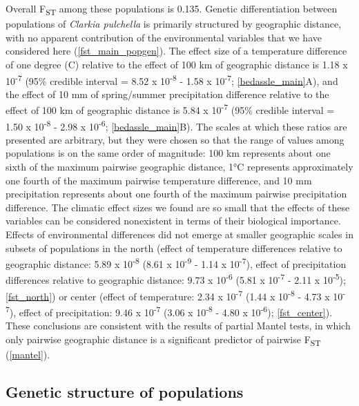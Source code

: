 \documentclass{article}
\begin{document}
Overall F\textsubscript{ST} among these populations is 0.135. Genetic differentiation between populations of \textit{Clarkia pulchella} is primarily structured by geographic distance, with no apparent contribution of the environmental variables that we have considered here (\autoref{fst_main_popgen}). The effect size of a temperature difference of one degree (C) relative to the effect of 100 km of geographic distance is 1.18 x 10\textsuperscript{-7} (95\% credible interval = 8.52 x 10\textsuperscript{-8} - 1.58 x 10\textsuperscript{-7}; \autoref{bedassle_main}A), and the effect of 10 mm of spring/summer precipitation difference relative to the effect of 100 km of geographic distance is 5.84 x 10\textsuperscript{-7} (95\% credible interval = 1.50 x 10\textsuperscript{-8} - 2.98 x 10\textsuperscript{-6}; \autoref{bedassle_main}B). The scales at which these ratios are presented are arbitrary, but they were chosen so that the range of values among populations is on the same order of magnitude: 100 km represents about one sixth of the maximum pairwise geographic distance, 1\si{\degree}C represents approximately one fourth of the maximum pairwise temperature difference, and 10 mm precipitation represents about one fourth of the maximum pairwise precipitation difference. The climatic effect sizes we found are so small that the effects of these variables can be considered nonexistent in terms of their biological importance. Effects of environmental differences did not emerge at smaller geographic scales in subsets of populations in the north (effect of temperature differences relative to geographic distance: 5.89 x 10\textsuperscript{-8} (8.61 x 10\textsuperscript{-9} - 1.14 x 10\textsuperscript{-7}), effect of precipitation differences relative to geographic distance: 9.73 x 10\textsuperscript{-6} (5.81 x 10\textsuperscript{-7} - 2.11 x 10\textsuperscript{-5}); \autoref{fst_north}) or center (effect of temperature: 2.34 x 10\textsuperscript{-7} (1.44 x 10\textsuperscript{-8} - 4.73 x 10\textsuperscript{-7}), effect of precipitation: 9.46 x 10\textsuperscript{-7} (3.06 x 10\textsuperscript{-8} - 4.80 x 10\textsuperscript{-6}); \autoref{fst_center}). These conclusions are consistent with the results of partial Mantel tests, in which only pairwise geographic distance is a significant predictor of pairwise F\textsubscript{ST} (\autoref{mantel}). 

\subsection*{Genetic structure of populations}
\end{document}
